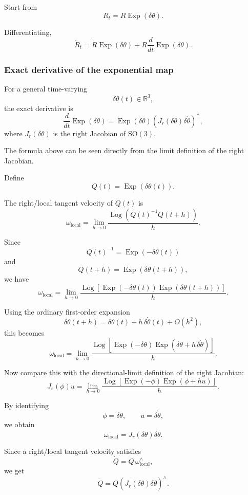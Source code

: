 \documentclass[11pt]{article}
\numberwithin{equation}{section}
\newcommand{\Exp}{\operatorname{Exp}}
\newcommand{\Log}{\operatorname{Log}}
\newcommand{\SO}{\mathrm{SO}}
\newcommand{\R}{\mathbb{R}}
\begin{document}
Start from
\[
R_t=R\Exp(\delta\theta).
\]

Differentiating,
\[
\dot R_t
=
\dot R\Exp(\delta\theta)
+
R\frac{d}{dt}\Exp(\delta\theta).
\]

\subsubsection*{Exact derivative of the exponential map}

For a general time-varying
\[
\delta\theta(t)\in\R^3,
\]
the exact derivative is
\begin{equation}
\boxed{
\frac{d}{dt}\Exp(\delta\theta)
=
\Exp(\delta\theta)
\left(
J_r(\delta\theta)\delta\dot\theta
\right)^\wedge,
}
\end{equation}
where $J_r(\delta\theta)$ is the right Jacobian of $\SO(3)$.

The formula above can be seen directly from the limit definition of the
right Jacobian.

Define
\[
Q(t)=\Exp(\delta\theta(t)).
\]

The right/local tangent velocity of $Q(t)$ is
\[
\omega_{\mathrm{local}}
=
\lim_{h\to0}
\frac{
\Log\!\left(
Q(t)^{-1}Q(t+h)
\right)
}{h}.
\]

Since
\[
Q(t)^{-1}
=
\Exp(-\delta\theta(t))
\]
and
\[
Q(t+h)
=
\Exp(\delta\theta(t+h)),
\]
we have
\[
\omega_{\mathrm{local}}
=
\lim_{h\to0}
\frac{
\Log\!\left[
\Exp(-\delta\theta(t))
\Exp(\delta\theta(t+h))
\right]
}{h}.
\]

Using the ordinary first-order expansion
\[
\delta\theta(t+h)
=
\delta\theta(t)
+
h\,\delta\dot\theta(t)
+
O(h^2),
\]
this becomes
\[
\omega_{\mathrm{local}}
=
\lim_{h\to0}
\frac{
\Log\!\left[
\Exp(-\delta\theta)
\Exp\!\left(
\delta\theta+h\,\delta\dot\theta
\right)
\right]
}{h}.
\]

Now compare this with the directional-limit definition of the right
Jacobian:
\begin{equation}
\boxed{
J_r(\phi)u
=
\lim_{h\to0}
\frac{
\Log\!\left[
\Exp(-\phi)
\Exp(\phi+hu)
\right]
}{h}.
}
\end{equation}

By identifying
\[
\phi=\delta\theta,
\qquad
u=\delta\dot\theta,
\]
we obtain
\begin{equation}
\boxed{
\omega_{\mathrm{local}}
=
J_r(\delta\theta)\delta\dot\theta.
}
\end{equation}

Since a right/local tangent velocity satisfies
\[
\dot Q
=
Q\,\omega_{\mathrm{local}}^\wedge,
\]
we get
\[
\dot Q
=
Q
\left(
J_r(\delta\theta)\delta\dot\theta
\right)^\wedge.
\]
\end{document}
